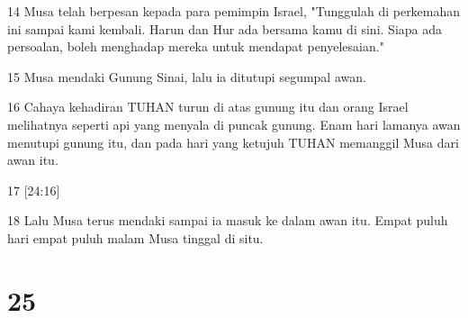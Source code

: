 \par 14 Musa telah berpesan kepada para pemimpin Israel, "Tunggulah di perkemahan ini sampai kami kembali. Harun dan Hur ada bersama kamu di sini. Siapa ada persoalan, boleh menghadap mereka untuk mendapat penyelesaian."
\par 15 Musa mendaki Gunung Sinai, lalu ia ditutupi segumpal awan.
\par 16 Cahaya kehadiran TUHAN turun di atas gunung itu dan orang Israel melihatnya seperti api yang menyala di puncak gunung. Enam hari lamanya awan menutupi gunung itu, dan pada hari yang ketujuh TUHAN memanggil Musa dari awan itu.
\par 17 [24:16]
\par 18 Lalu Musa terus mendaki sampai ia masuk ke dalam awan itu. Empat puluh hari empat puluh malam Musa tinggal di situ.

\chapter{25}

